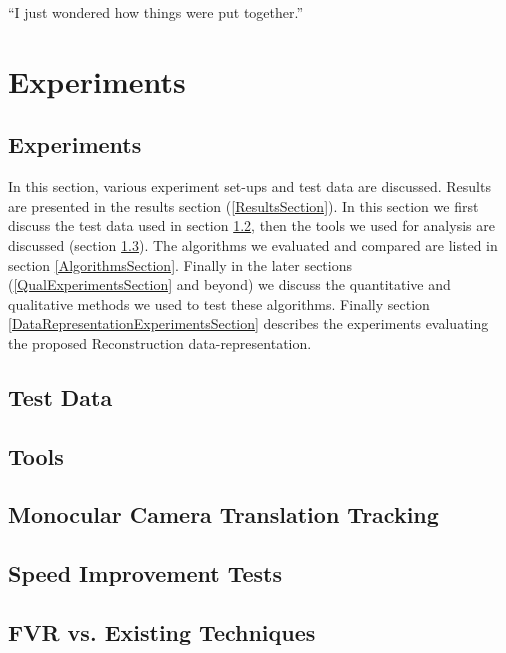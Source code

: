 \begin{savequote}[8cm]
  ``I just wondered how things were put together.''
\end{savequote}
\makeatletter
\chapter{Experiments}

\section{Experiments}

In this section, various experiment set-ups and test data are discussed. Results are presented in the results section (\ref{ResultsSection}). In this section we first discuss the test data used in section \ref{TestDataSection}, then the tools we used for analysis are discussed (section \ref{ToolsSection}). The algorithms we evaluated and compared are listed in section \ref{AlgorithmsSection}. Finally in the later sections (\ref{QualExperimentsSection} and beyond) we discuss the quantitative and qualitative methods we used to test these algorithms. Finally section \ref{DataRepresentationExperimentsSection} describes the experiments evaluating the proposed Reconstruction data-representation. 

\section{Test Data}
\label{TestDataSection}


\section{Tools}
\label{ToolsSection}




\section{Monocular Camera Translation Tracking}
\section{Speed Improvement Tests}


\section{FVR vs. Existing Techniques}
